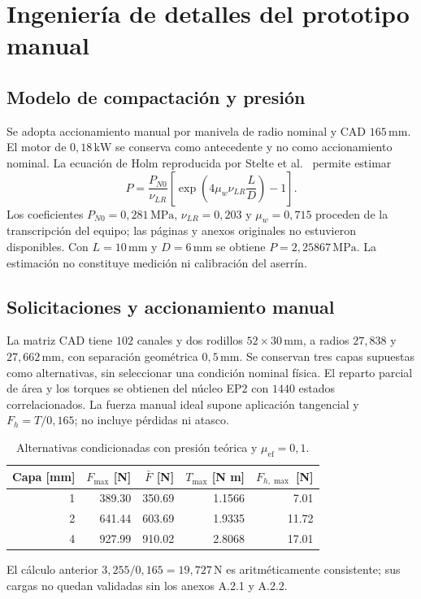 \section{Ingeniería de detalles del prototipo manual}
\subsection{Modelo de compactación y presión}
Se adopta accionamiento manual por manivela de radio nominal y CAD $165\,\mathrm{mm}$.
El motor de $0,18\,\mathrm{kW}$ se conserva como antecedente y no como accionamiento nominal.
La ecuación de Holm reproducida por Stelte et al.\ \parencite{stelte_presion_2011} permite estimar
\begin{equation}P=\frac{P_{N0}}{\nu_{LR}}\left[\exp\left(4\mu_w\nu_{LR}\frac{L}{D}\right)-1\right].\end{equation}
Los coeficientes $P_{N0}=0,281\,\mathrm{MPa}$, $\nu_{LR}=0,203$ y $\mu_w=0,715$
proceden de la transcripción del equipo; las páginas y anexos originales no estuvieron disponibles.
Con $L=10\,\mathrm{mm}$ y $D=6\,\mathrm{mm}$ se obtiene $P=2,25867\,\mathrm{MPa}$.
La estimación no constituye medición ni calibración del aserrín.
\subsection{Solicitaciones y accionamiento manual}
La matriz CAD tiene $102$ canales y dos rodillos $52\times30\,\mathrm{mm}$,
a radios $27,838$ y $27,662\,\mathrm{mm}$, con separación geométrica $0,5\,\mathrm{mm}$.
Se conservan tres capas supuestas como alternativas, sin seleccionar una condición nominal física.
El reparto parcial de área y los torques se obtienen del núcleo EP2 con $1440$ estados correlacionados.
La fuerza manual ideal supone aplicación tangencial y $F_h=T/0,165$; no incluye pérdidas ni atasco.
\begin{table}[ht]\centering
\begin{tabular}{rrrrr}\toprule
Capa [mm]&$F_{\max}$ [N]&$\bar F$ [N]&$T_{\max}$ [N m]&$F_{h,\max}$ [N]\\\midrule
1 & 389.30 & 350.69 & 1.1566 & 7.01\\
2 & 641.44 & 603.69 & 1.9335 & 11.72\\
4 & 927.99 & 910.02 & 2.8068 & 17.01\\
\bottomrule\end{tabular}
\caption{Alternativas condicionadas con presión teórica y $\mu_{\mathrm{ef}}=0,1$.}
\end{table}
El cálculo anterior $3,255/0,165=19,727\,\mathrm{N}$ es aritméticamente consistente;
sus cargas no quedan validadas sin los anexos A.2.1 y A.2.2.
